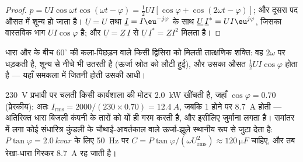 \begin{proof}
$p = UI\cos\omega t\cos(\omega t - \varphi) = \tfrac12 UI[\cos\varphi +
\cos(2\omega t - \varphi)]$; और दूसरा पद औसत में शून्य हो जाता है।
$\underline U = U$ तथा $\underline I = I\eu^{-j\varphi}$ के साथ
$\underline U\,\underline I^* = UI\eu^{j\varphi}$, जिसका वास्तविक भाग
$UI\cos\varphi$ है; और $\underline U = \underline Z\,\underline I$ से
$\underline U\,\underline I^* = \underline Z I^2$ मिलता है।
\end{proof}

\begin{omfigure}

{\small धारा और  के बीच $60^\circ$ की कला-पिछड़न वाले किसी द्विसिरा
को मिलती तात्क्षणिक शक्ति: वह $2\omega$ पर धड़कती है, शून्य से नीचे भी उतरती
है (ऊर्जा स्रोत को लौटी हुई), और उसका औसत $\tfrac12 UI\cos\varphi$ होता है
--- यहाँ समकला में जितनी होती उसकी आधी।}
\end{omfigure}

\begin{example}[शक्ति गुणक का संशोधन]\label{ex:b1:sinusoidal-impedance:pf}
\qty{230}{V} प्रभावी पर चलती किसी कार्यशाला की मोटर \qty{2.0}{kW} खींचती है, जहाँ
$\cos\varphi = 0.70$ (प्रेरकीय): अतः $I_{\mathrm{rms}} = 2000/(230 \times
0.70) = \qty{12.4}{A}$, जबकि  $1$ होने पर \qty{8.7}{A} होती
--- अतिरिक्त धारा बिजली कंपनी के तारों को यों ही गरम करती है, और इसीलिए
जुर्माना लगता है। समांतर में लगा कोई संधारित्र कुंडली के चौथाई-आवर्तकाल वाले
ऊर्जा-झूले स्थानीय रूप से जुटा देता है: \emph{} $P\tan\varphi =
\qty{2.0}{kvar}$ के लिए \qty{50}{Hz} पर $C = P\tan\varphi/(\omega U_{\mathrm{rms}}^2)
\approx \qty{120}{\micro F}$ चाहिए, और तब रेखा-धारा गिरकर
\qty{8.7}{A} रह जाती है।
\end{example}

